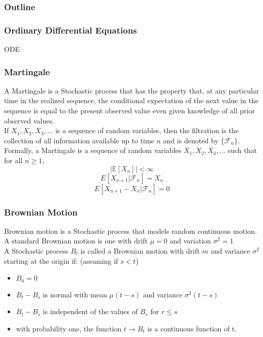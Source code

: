 \documentclass{beamer}
\begin{document}
\begin{frame}
    \frametitle{Outline}
    
    
\end{frame}





\begin{frame}
    \frametitle{Ordinary Differential Equations}
    ODE 
    

\end{frame}






\begin{frame}
    \frametitle{Martingale}
    A Martingale is a Stochastic process that has the property that, at any particular time in the realized sequence, the conditional expectation of the next value in the sequence is equal to the present observed value even given knowledge of all prior observed values.\\
    \vspace{0.5cm}
    If $X_1, X_2, X_3, \ldots$  is a sequence of random variables, then the filtration is the collection of all information available up to time $n$ and is denoted by $\{\mathcal{F}_n\}$.\\ 
    \vspace{0.5cm}
    Formally, a Martingale is a sequence of random variables $X_1, X_2, X_3, \ldots$ such that for all $n \geq 1$,
    $$|\mathbb{E}[X_n]| < \infty$$
    $$E[X_{n+1} | \mathcal{F}_n] = X_n$$
    $$E[X_{n+1} - X_n | \mathcal{F}_n] = 0$$
\end{frame}

\begin{frame}
    \frametitle{Brownian Motion}
    Brownian motion is a Stochastic process that models random continuous motion.\\
    A standard Brownian motion is one with drift $\mu=0$ and variation $\sigma^2= 1$\\
    A Stochastic process $B_t$ is called a Brownian motion with drift $m$ and variance $\sigma^2$ starting at the origin if: (assuming if $s<t$)
    \begin{itemize}
        \item $B_0 = 0$
        \item $B_t -B_s$ is normal with mean $\mu(t-s)$ and variance $\sigma^2(t-s)$
        \item $B_t - B_s$ is independent of the values of $B_r$ for $r \leq s$
        \item with probability one, the function $t \rightarrow B_t$ is a continuous function of t.
    \end{itemize}

\end{frame}
\end{document}
